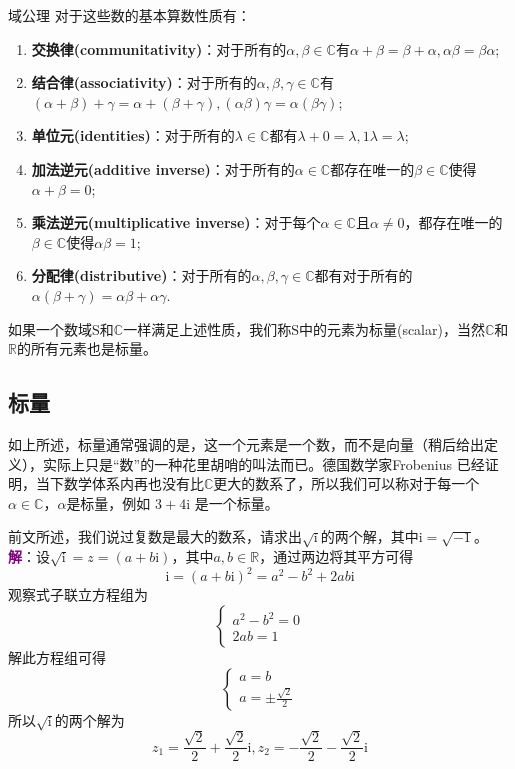 \begin{axiom}{域公理}
	对于这些数的基本算数性质有：
	\begin{enumerate}
		\item \textbf{交换律(communitativity)}：对于所有的$\alpha,\beta \in \mathbb{C}$有$\alpha+\beta=\beta+\alpha,\alpha\beta=\beta\alpha$;
		\item \textbf{结合律(associativity)}：对于所有的$\alpha,\beta,\gamma \in \mathbb{C}$有$(\alpha+\beta)+\gamma=\alpha+(\beta+\gamma),(\alpha\beta)\gamma=\alpha(\beta\gamma)$;
		\item \textbf{单位元(identities)}：对于所有的$\lambda \in \mathbb{C}$都有$\lambda+0=\lambda,1\lambda=\lambda$;
		\item \textbf{加法逆元(additive inverse)}：对于所有的$\alpha \in \mathbb{C}$都存在唯一的$\beta \in \mathbb{C}$使得$\alpha+\beta=0$;
		\item \textbf{乘法逆元(multiplicative inverse)}：对于每个$\alpha \in\mathbb{C}$且$\alpha\neq 0$，都存在唯一的$\beta \in \mathbb{C}$使得$\alpha\beta=1$;
		\item \textbf{分配律(distributive)}：对于所有的$\alpha,\beta,\gamma \in \mathbb{C}$都有对于所有的$\alpha(\beta+\gamma)=\alpha\beta +\alpha\gamma$.
	\end{enumerate}
\end{axiom}

如果一个数域$\mathrm{S}$和$\mathbb{C}$一样满足上述性质，我们称$\mathrm{S}$中的元素为标量(scalar)，当然$\mathbb{C}$和$\mathbb{R}$的所有元素也是标量。

\subsection{标量}

如上所述，标量通常强调的是，这一个元素是一个数，而不是向量（稍后给出定义），实际上只是``数''的一种花里胡哨的叫法而已。德国数学家Frobenius 已经证明，当下数学体系内再也没有比$\mathbb{C}$更大的数系了，所以我们可以称对于每一个$\alpha \in \mathbb{C}$，$\alpha$是标量，例如 $3+4\mathrm{i}$ 是一个标量。

\begin{example}
	前文所述，我们说过复数是最大的数系，请求出$\sqrt{\mathrm{i}}$的两个解，其中$\mathrm{i}=\sqrt{-1}$。
	\tcblower
	\textcolor{purple}{\textbf{解}}：设$\sqrt{\mathrm{i}}=z=(a+b\mathrm{i})$，其中$a,b \in \mathbb{R}$，通过两边将其平方可得$$\mathrm{i}=(a+b\mathrm{i})^2=a^2-b^2+2ab\mathrm{i}$$观察式子联立方程组为$$\left\{\begin{matrix} 
		a^2-b^2=0 \\  
		2ab=1
	\end{matrix}\right. $$
	解此方程组可得$$\left\{\begin{matrix} 
		a=b \\ 
		a=\pm \frac{\sqrt{2} }{2} 
	\end{matrix}\right. $$
	所以$\sqrt{\mathrm{i}}$的两个解为$$z_1=\frac{\sqrt{2}}{2}+\frac{\sqrt{2}}{2}\mathrm{i},z_2=-\frac{\sqrt{2}}{2}-\frac{\sqrt{2}}{2}\mathrm{i}$$
\end{example}


